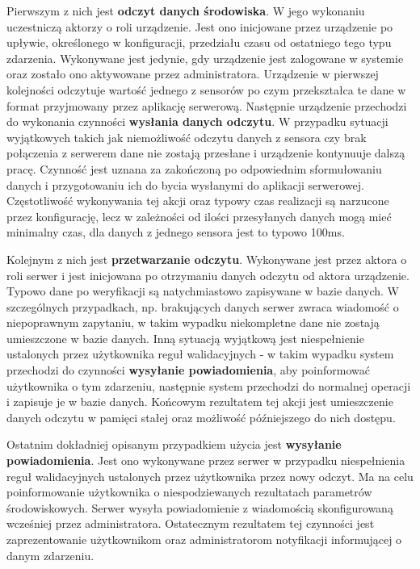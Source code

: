 Pierwszym z nich jest \textbf{odczyt danych środowiska}. W jego wykonaniu uczestniczą aktorzy o roli
urządzenie. Jest ono inicjowane przez urządzenie po upływie, określonego w konfiguracji, przedziału 
czasu od ostatniego tego typu zdarzenia. Wykonywane jest jedynie, gdy urządzenie jest zalogowane w systemie
oraz zostało ono aktywowane przez administratora. Urządzenie w pierwszej kolejności odczytuje wartość
jednego z sensorów po czym przekształca te dane w format przyjmowany przez aplikację serwerową. 
Następnie urządzenie przechodzi do wykonania czynności \textbf{wysłania danych odczytu}. 
W przypadku sytuacji wyjątkowych takich jak niemożliwość odczytu danych z sensora czy brak połączenia
z serwerem dane nie zostają przesłane i urządzenie kontynuuje dalszą pracę. Czynność jest uznana
za zakończoną po odpowiednim sformułowaniu danych i przygotowaniu ich do bycia wysłanymi do aplikacji serwerowej.
Częstotliwość wykonywania tej akcji oraz typowy czas realizacji są narzucone przez konfigurację, lecz w zależności
od ilości przesyłanych danych mogą mieć minimalny czas, dla danych z jednego sensora jest to typowo 100ms.

Kolejnym z nich jest \textbf{przetwarzanie odczytu}. Wykonywane jest przez aktora o roli serwer i jest 
inicjowana po otrzymaniu danych odczytu od aktora urządzenie. Typowo dane po weryfikacji są natychmiastowo
zapisywane w bazie danych. W szczególnych przypadkach, np. brakujących danych serwer zwraca wiadomość
o niepoprawnym zapytaniu, w takim wypadku niekompletne dane nie zostają umieszczone w bazie danych.
Inną sytuacją wyjątkową jest niespełnienie ustalonych przez użytkownika
reguł walidacyjnych - w takim wypadku system przechodzi do czynności \textbf{wysyłanie powiadomienia}, aby
poinformować użytkownika o tym zdarzeniu, następnie system przechodzi do normalnej operacji i zapisuje je
w bazie danych. Końcowym rezultatem tej akcji jest umieszczenie danych odczytu w pamięci stałej oraz
możliwość późniejszego do nich dostępu.

Ostatnim dokładniej opisanym przypadkiem użycia jest \textbf{wysyłanie powiadomienia}. Jest ono wykonywane
przez serwer w przypadku niespełnienia reguł walidacyjnych ustalonych przez użytkownika przez nowy odczyt.
Ma na celu poinformowanie użytkownika o niespodziewanych rezultatach parametrów środowiskowych.
Serwer wysyła powiadomienie z wiadomością skonfigurowaną wcześniej przez administratora. 
Ostatecznym rezultatem tej czynności jest zaprezentowanie użytkownikom oraz administratorom notyfikacji
informującej o danym zdarzeniu.

